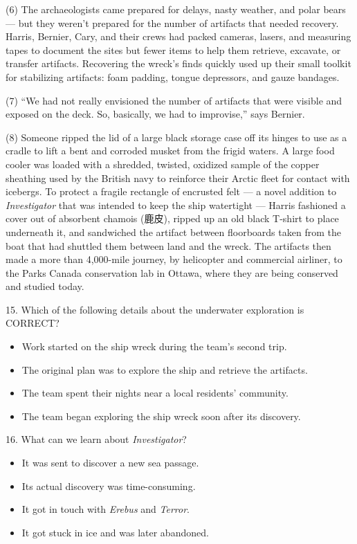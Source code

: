 \documentclass[UTF8,11pt]{ctexart}
\begin{document}
(6) The archaeologists came prepared for delays, nasty weather, and polar bears — but they weren’t prepared for the number of artifacts that needed recovery. Harris, Bernier, Cary, and their crews had packed cameras, lasers, and measuring tapes to document the sites but fewer items to help them retrieve, excavate, or transfer artifacts. Recovering the wreck’s finds quickly used up their small toolkit for stabilizing artifacts: foam padding, tongue depressors, and gauze bandages.


(7) “We had not really envisioned the number of artifacts that were visible and exposed on the deck. So, basically, we had to improvise,” says Bernier.


(8) Someone ripped the lid of a large black storage case off its hinges to use as a cradle to lift a bent and corroded musket from the frigid waters. A large food cooler was loaded with a shredded, twisted, oxidized sample of the copper sheathing used by the British navy to reinforce their Arctic fleet for contact with icebergs. To protect a fragile rectangle of encrusted felt — a novel addition to \textit{Investigator} that was intended to keep the ship watertight — Harris fashioned a cover out of absorbent chamois (鹿皮), ripped up an old black T-shirt to place underneath it, and sandwiched the artifact between floorboards taken from the boat that had shuttled them between land and the wreck. The artifacts then made a more than 4,000-mile journey, by helicopter and commercial airliner, to the Parks Canada conservation lab in Ottawa, where they are being conserved and studied today.


15. Which of the following details about the underwater exploration is CORRECT?


\begin{itemize}[leftmargin=2em,itemsep=.2em,topsep=.4em]\item[A.] Work started on the ship wreck during the team’s second trip.
\item[B.] The original plan was to explore the ship and retrieve the artifacts.
\item[C.] The team spent their nights near a local residents’ community.
\item[D.] The team began exploring the ship wreck soon after its discovery.
\end{itemize}

16. What can we learn about \textit{Investigator}?


\begin{itemize}[leftmargin=2em,itemsep=.2em,topsep=.4em]\item[A.] It was sent to discover a new sea passage.
\item[B.] Its actual discovery was time-consuming.
\item[C.] It got in touch with \textit{Erebus} and \textit{Terror}.
\item[D.] It got stuck in ice and was later abandoned.
\end{itemize}
\end{document}
